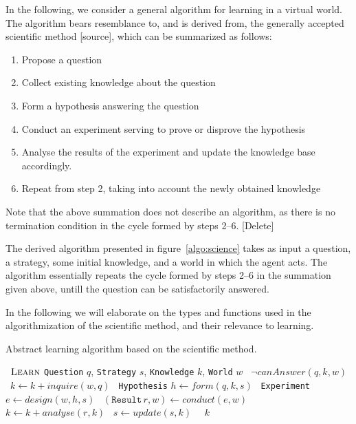 \documentclass[../Master.tex]{subfiles}
\begin{document}
In the following, we consider a general algorithm for learning in a virtual world. The algorithm bears resemblance to, and is derived from, the generally accepted scientific method [source], which can be summarized as follows:

\begin{enumerate}
    \item Propose a question
    \item Collect existing knowledge about the question
    \item Form a hypothesis answering the question
    \item Conduct an experiment serving to prove or disprove the hypothesis
    \item Analyse the results of the experiment and update the knowledge base accordingly.
    \item Repeat from step 2, taking into account the newly obtained knowledge
\end{enumerate}

Note that the above summation does not describe an algorithm, as there is no termination condition in the cycle formed by steps 2--6. [Delete]

The derived algorithm presented in figure~\ref{algo:science} takes as input a question, a strategy, some initial knowledge, and a world in which the agent acts. The algorithm essentially repeats the cycle formed by steps 2--6 in the summation given above, untill the question can be satisfactorily answered.

In the following we will elaborate on the types and functions used in the algorithmization of the scientific method, and their relevance to learning.

\begin{algorithm}
    \caption{Abstract learning algorithm based on the scientific method.}\label{algo:science}

    \begin{algorithmic}
        \Function~{$\textsc{Learn}$} {\texttt{Question} $q$, \texttt{Strategy} $s$, \texttt{Knowledge} $k$, \texttt{World} $w$}
            \While~{$\neg canAnswer(q, k, w)$}
                \State~$k \gets k + inquire(w, q)$
                \State~\texttt{Hypothesis} $h \gets form(q, k, s)$
                \State~\texttt{Experiment} $e \gets design(w, h, s)$
                \State~$(\texttt{Result} \, r, w) \gets conduct(e, w)$
                \State~$k \gets k + analyse(r, k)$
                \State~$s \gets update(s, k)$
            \EndWhile%
            \State~\Return~$k$
        \EndFunction%
    \end{algorithmic}
\end{algorithm}
\end{document}
